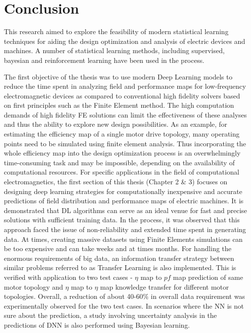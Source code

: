\section{Conclusion}

This research aimed to explore the feasibility of modern statistical learning techniques for aiding the design optimization and analysis of electric devices and machines. A number of statistical learning methods, including supervised, bayesian and reinforcement learning have been used in the process. 

The first objective of the thesis was to use modern Deep Learning models to reduce the time spent in analyzing field and performance maps for low-frequency electromagnetic devices as compared to conventional high fidelity solvers based on first principles such as the Finite Element method. The high computation demands of high fidelity FE solutions can limit the effectiveness of these analyses and thus the ability to explore new design possibilities. As an example, for estimating the efficiency map of a single motor drive topology, many operating points need to be simulated using finite element analysis. Thus incorporating the whole efficiency map into the design optimization process is an overwhelmingly time-consuming task and may be impossible, depending on the availability of computational resources. For specific applications in the field of computational electromagnetics, the first section of this thesis (Chapter 2 \& 3) focuses on designing deep learning strategies for computationally inexpensive and accurate predictions of field distribution and performance maps of electric machines. It is demonstrated that DL algorithms can serve as an ideal venue for fast and precise solutions with sufficient training data. In the process, it was observed that this approach faced the issue of non-reliability and extended time spent in generating data. At times, creating massive datasets using Finite Elements simulations can be too expensive and can take weeks and at times months. For handling the enormous requirements of big data, an information transfer strategy between similar problems referred to as Transfer Learning is also implemented. This is verified with application to two test cases - $\eta$ map to $pf$ map prediction of same motor topology and $\eta$ map to $\eta$ map knowledge transfer for different motor topologies. Overall, a reduction of about 40-60\% in overall data requirement was experimentally observed for the two test cases. In scenarios where the NN is not sure about the prediction, a study involving uncertainty analysis in the predictions of DNN is also performed using Bayesian learning. 

